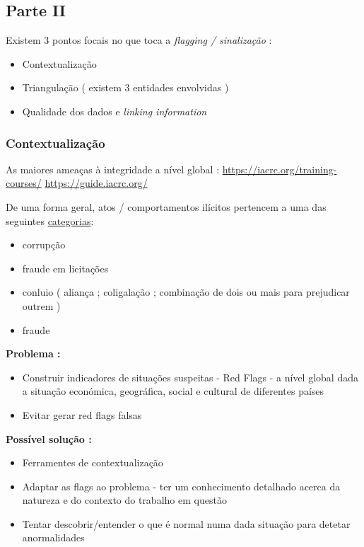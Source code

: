 \documentclass{book}
\begin{document}
  
  
  
  
\subsection*{Parte II}
  
Existem 3 pontos focais no que toca a \textit{flagging / sinalização} :

\begin{itemize}
	\item Contextualização
	\item Triangulação ( existem 3 entidades envolvidas )
	\item Qualidade dos dados e \textit{linking information}
\end{itemize}



\subsubsection*{Contextualização}

As maiores ameaças à integridade a nível global : \url{https://iacrc.org/training-courses/} \url{https://guide.iacrc.org/}


De uma forma geral, atos / comportamentos ilícitos pertencem a uma das seguintes \href{https://guide.iacrc.org/proof-of-common-schemes/}{categorias}: 

\begin{itemize}
	\item corrupção
	\item fraude em licitações
	\item conluio ( aliança ; coligalação ; combinação de dois ou mais para prejudicar outrem )
	\item fraude	
\end{itemize}
  
\textbf{Problema :} 

\begin{itemize}
	\item Construir indicadores de situações suspeitas - Red Flags - a nível global dada a situação económica, geográfica, social e cultural de diferentes países
	\item Evitar gerar red flags falsas
\end{itemize}


\textbf{Possível solução : }

\begin{itemize}
	\item Ferramentes de contextualização 
	\item Adaptar as flags ao problema - ter um conhecimento detalhado acerca da natureza e do contexto do trabalho em questão
	\item Tentar descobrir/entender o que é normal numa dada situação para detetar anormalidades
\end{itemize}
\end{document}

